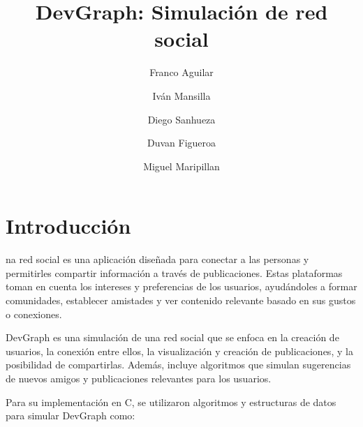 \documentclass[9pt,letterpaper,onecolumn]{rho-class/rho}
\title{DevGraph: Simulación de red social}
\author[$\dagger$]{Franco Aguilar}
\author[$\dagger$]{Iván Mansilla}
\author[$\dagger$]{Diego Sanhueza}
\author[$\dagger$]{Duvan Figueroa}
\author[$\dagger$]{Miguel Maripillan}
\affil[$\dagger$]{Universidad de Magallanes}
\begin{document}
	
    \maketitle
    \thispagestyle{firststyle}
    \tableofcontents


\newpage
\section{Introducción}
	na red social es una aplicación diseñada para conectar a las personas y permitirles compartir información a través de publicaciones. Estas plataformas toman en cuenta los intereses y preferencias de los usuarios, ayudándoles a formar comunidades, establecer amistades y ver contenido relevante basado en sus gustos o conexiones.

DevGraph es una simulación de una red social que se enfoca en la creación de usuarios, la conexión entre ellos, la visualización y creación de publicaciones, y la posibilidad de compartirlas. Además, incluye algoritmos que simulan sugerencias de nuevos amigos y publicaciones relevantes para los usuarios.

Para su implementación en C, se utilizaron algoritmos y estructuras de datos para simular DevGraph como:
\end{document}
